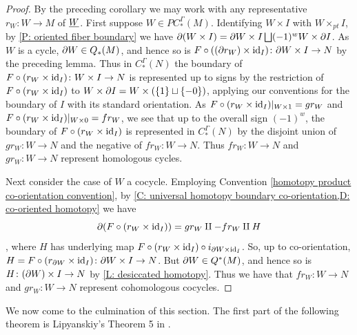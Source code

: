 \begin{proof}
	By the preceding corollary we may work with any representative $r_W \colon W \to M$ of $\underline{W}$.
	First suppose $W \in PC_*^\Gamma(M)$.
	Identifying $W \times I$ with $W \times_{pt} I$, by \cref{P: oriented fiber boundary} we have $\partial (W \times I) = \partial W \times I \bigsqcup (-1)^{w} W \times \partial I$.
	As $W$ is a cycle, $\partial W \in Q_*(M)$, and hence so is $F \circ ((\partial r_W) \times \mathrm{id}_I) \colon \partial W \times I \to N$ by the preceding lemma.
	Thus in $C^\Gamma_*(N)$ the boundary of $F \circ (r_W \times \mathrm{id}_I) \colon W \times I \to N$ is represented up to signs by the restriction of
	$F \circ (r_W \times \mathrm{id}_I)$ to $W \times \partial I = W \times (\{1\} \sqcup \{-0\})$, applying our conventions for the boundary of $I$ with its standard orientation.
	As $F \circ (r_W \times \mathrm{id}_I)|_{W \times 1} = gr_W$ and $F \circ (r_W \times \mathrm{id}_I)|_{W \times 0} = fr_W$, we see that up to the overall sign $(-1)^{w}$, the boundary of $F \circ (r_W \times \mathrm{id}_I)$ is represented in $C_*^\Gamma(N)$ by the disjoint union of $gr_W \colon W \to N$ and the negative of $fr_W \colon W \to N$.
	Thus $fr_W \colon W \to N$ and $gr_W \colon W \to N$ represent homologous cycles.

	Next consider the case of $W$ a cocycle.
	Employing Convention \ref{homotopy product co-orientation convention}, by \cref{C: universal homotopy boundary co-orientation,D: co-oriented homotopy} we have
	\[
	\partial (F \circ (r_W \times \mathrm{id}_I)) = gr_W \amalg -fr_W \amalg H
	\],
	where $H$ has underlying map $F \circ (r_W \times \mathrm{id}_I) \circ i_{\partial W \times \mathrm{id}_I}$.
	So, up to co-orientation, $H = F \circ (r_{\partial W} \times \mathrm{id}_I) \colon \partial W \times I \to N$.
	But $\partial W \in Q^*(M)$, and hence so is $H \colon (\partial W) \times I \to N$ by \cref{L: desiccated homotopy}.
	Thus we have
	that $fr_W \colon W \to N$ and $gr_W \colon W \to N$ represent cohomologous cocycles.
\end{proof}

We now come to the culmination of this section.
The first part of the following theorem is Lipyanskiy's Theorem 5 in \cite{Lipy14}.

